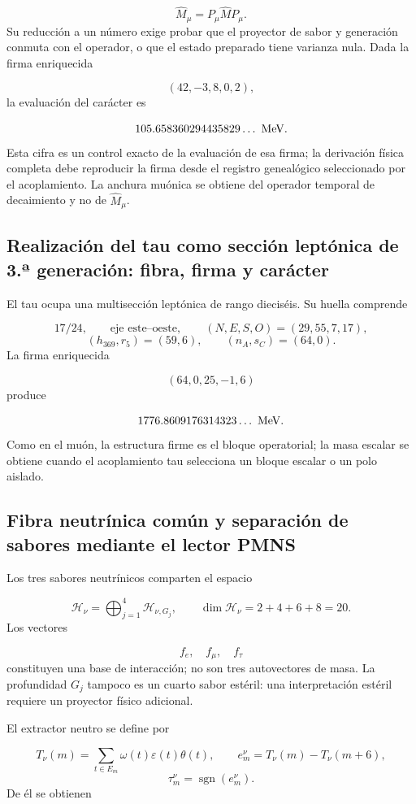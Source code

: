 \[
 \widehat M_\mu=P_\mu\widehat M P_\mu.
\]
Su reducción a un número exige probar que el proyector de sabor y generación conmuta con el operador, o que el estado preparado tiene varianza nula. Dada la firma enriquecida

\[
 (42,-3,8,0,2),
\]
la evaluación del carácter es

\[
 105.658360294435829\ldots\ {\rm MeV}.
\]
Esta cifra es un control exacto de la evaluación de esa firma; la derivación física completa debe reproducir la firma desde el registro genealógico seleccionado por el acoplamiento. La anchura muónica se obtiene del operador temporal de decaimiento y no de \(\widehat M_\mu\).

\subsection{Realización del tau como sección leptónica de 3.ª generación: fibra, firma y carácter}
El tau ocupa una multisección leptónica de rango dieciséis. Su huella comprende

\[
 17/24,\qquad \text{eje este--oeste},\qquad
 (N,E,S,O)=(29,55,7,17),
\]
\[
 (h_{369},r_5)=(59,6),\qquad
 (n_A,s_C)=(64,0).
\]
La firma enriquecida

\[
 (64,0,25,-1,6)
\]
produce

\[
 1776.8609176314323\ldots\ {\rm MeV}.
\]
Como en el muón, la estructura firme es el bloque operatorial; la masa escalar se obtiene cuando el acoplamiento tau selecciona un bloque escalar o un polo aislado.

\subsection{Fibra neutrínica común y separación de sabores mediante el lector PMNS}
Los tres sabores neutrínicos comparten el espacio

\[
 \mathcal H_\nu=
 \bigoplus_{j=1}^{4}\mathcal H_{\nu,G_j},
\qquad
 \dim\mathcal H_\nu=2+4+6+8=20.
\]
Los vectores

\[
 f_e,\quad f_\mu,\quad f_\tau
\]
constituyen una base de interacción; no son tres autovectores de masa. La profundidad \(G_j\) tampoco es un cuarto sabor estéril: una interpretación estéril requiere un proyector físico adicional.

El extractor neutro se define por

\[
 T_\nu(m)=\sum_{t\in E_m}
 \omega(t)\varepsilon(t)\theta(t),
\qquad
 e_m^\nu=T_\nu(m)-T_\nu(m+6),
\]
\[
 \tau_m^\nu=\operatorname{sgn}(e_m^\nu).
\]
De él se obtienen


